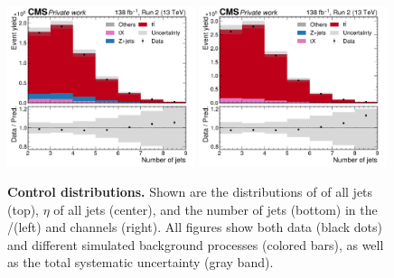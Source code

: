\begin{figure}[!hp]
    \includegraphics[width=0.49\textwidth]{figures/ah/controlplots/ReqMET/sf/njet_ReqMET_sf.pdf}
    \hfill
    \includegraphics[width=0.49\textwidth]{figures/ah/controlplots/ReqMET/em/njet_ReqMET_em.pdf}
    \caption{
        \textbf{Control distributions.} Shown are the distributions of \pt of all jets (top), $\eta$ of all jets (center), and the number of jets (bottom) in the \ee/\mumu (left) and \emu channels (right). All figures show both data (black dots) and different simulated background processes (colored bars), as well as the total systematic uncertainty (gray band). 
    }
    \label{fig:ah:control2}
\end{figure}

